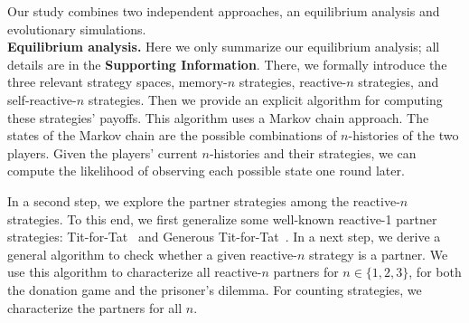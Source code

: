 \documentclass[11pt]{article}
\def\SI{\textbf{Supporting Information}}
\begin{document}
Our study combines two independent approaches, an equilibrium analysis and evolutionary simulations.\\

\noindent
{\bf Equilibrium analysis.} Here we only summarize our equilibrium analysis; all details are in the \SI. 
There, we formally introduce the three relevant strategy spaces, memory-$n$ strategies, reactive-$n$ strategies, and self-reactive-$n$ strategies. 
Then we provide an explicit algorithm for computing these strategies' payoffs. 
This algorithm uses a Markov chain approach. 
The states of the Markov chain are the possible combinations of $n$-histories of the two players. 
Given the players' current $n$-histories and their strategies, we can compute the likelihood of observing each possible state one round later. 

In a second step, we explore the partner strategies among the reactive-$n$ strategies. 
To this end, we first generalize some well-known reactive-1 partner strategies: Tit-for-Tat~\citep{axelrod:AAAS:1981} and Generous Tit-for-Tat~\citep{nowak:Nature:1992,molander:jcr:1985}. 
In a next step, we derive a general algorithm to check whether a given reactive-$n$ strategy is a partner. 
We use this algorithm to characterize all reactive-$n$ partners for $n\!\in\!\{1,2,3\}$, for both the donation game and the prisoner's dilemma. 
For counting strategies, we characterize the partners for all $n$.\\
\end{document}
